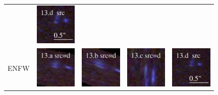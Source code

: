 \documentclass[useAMS,usenatbib]{mn2e}
\begin{document}
\begin{table}
\begin{tabular}{ccccc}
    & \multicolumn{1}{m{1.7cm}}{\includegraphics[height=2.00cm,clip]{figs/nsie_img/rgb.src_13_d.ps}} \\
    \multicolumn{1}{m{1cm}}{{\Large ENFW}}
    & \multicolumn{1}{m{1.7cm}}{\includegraphics[height=2.00cm,clip]{figs/enfw_img/rgb.pre_13_a_d_tri.ps}}
    & \multicolumn{1}{m{1.7cm}}{\includegraphics[height=2.00cm,clip]{figs/enfw_img/rgb.pre_13_b_d_tri.ps}}
    & \multicolumn{1}{m{1.7cm}}{\includegraphics[height=2.00cm,clip]{figs/enfw_img/rgb.pre_13_c_d_tri.ps}}
    & \multicolumn{1}{m{1.7cm}}{\includegraphics[height=2.00cm,clip]{figs/enfw_img/rgb.src_13_d.ps}} \\
  \end{tabular}

\end{table}
\end{document}
